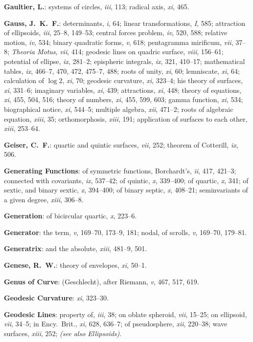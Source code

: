 \documentclass[11pt,a4paper]{article}
\newcommand{\IndexEntry}[1]{\textbf{#1}}
\newcommand{\SeeAlso}[1]{\textit{(see also #1)}}
\newcommand{\V}[1]{\textit{#1}} %
\begin{document}
\IndexEntry{Gaultier, L.}: systems of circles, \V{iii}, 113; radical axis, \V{xi}, 465.

\IndexEntry{Gauss, J.\ K.\ F.}: determinants, \V{i}, 64; linear transformations, \V{I}, 585; attraction of ellipsoids, \V{iii}, 25--8, 149--53; central forces problem, \V{iv}, 520, 588; relative motion, \V{iv}, 534; binary quadratic forms, \V{v}, 618; pentagramma mirificum, \V{vii}, 37--8; \textit{Theoria Motus}, \V{vii}, 414; geodesic lines on quadric surface, \V{viii}, 156--61; potential of ellipse, \V{ix}, 281--2; epispheric integrals, \V{ix}, 321, 410--17; mathematical tables, \V{ix}, 466--7, 470, 472, 475--7, 488; roots of unity, \V{xi}, 60; lemniscate, \V{xi}, 64; calculation of $\log 2$, \V{xi}, 70; geodesic curvature, \V{xi}, 323--4; his theory of surfaces, \V{xi}, 331--6; imaginary variables, \V{xi}, 439; attractions, \V{xi}, 448; theory of equations, \V{xi}, 455, 504, 516; theory of numbers, \V{xi}, 455, 599, 603; gamma function, \V{xi}, 534; biographical notice, \V{xi}, 544--5; multiple algebra, \V{xii}, 471--2; roots of algebraic equation, \V{xiii}, 35; orthomorphosis, \V{xiii}, 191; application of surfaces to each other, \V{xiii}, 253--64.

\IndexEntry{Geiser, C.\ F.}: quartic and quintic surfaces, \V{vii}, 252; theorem of Cotterill, \V{ix}, 506.

\IndexEntry{Generating Functions}: of symmetric functions, Borchardt's, \V{ii}, 417, 421--3; connected with covariants, \V{ix}, 537--42; of quintic, \V{x}, 339--400; of quartic, \V{x}, 341; of sextic, and binary sextic, \V{x}, 394--400; of binary septic, \V{x}, 408--21; seminvariants of a given degree, \V{xiii}, 306--8.

\IndexEntry{Generation}: of bicircular quartic, \V{x}, 223--6.

\IndexEntry{Generator}: the term, \V{v}, 169--70, 173--9, 181; nodal, of scrolls, \V{v}, 169--70, 179--81.

\IndexEntry{Generatrix}: and the absolute, \V{xiii}, 481--9, 501.

\IndexEntry{Genese, R.\ W.}: theory of envelopes, \V{xi}, 50--1.

\IndexEntry{Genus of Curve}: (Geschlecht), after Riemann, \V{v}, 467, 517, 619.

\IndexEntry{Geodesic Curvature}: \V{xi}, 323--30.

\IndexEntry{Geodesic Lines}: property of, \V{iii}, 38; on oblate spheroid, \V{vii}, 15--25; on ellipsoid, \V{vii}, 34--5; in Ency.\ Brit., \V{xi}, 628, 636--7; of pseudosphere, \V{xii}, 220--38; wave surfaces, \V{xiii}, 252; \SeeAlso{Ellipsoids}.
\end{document}
